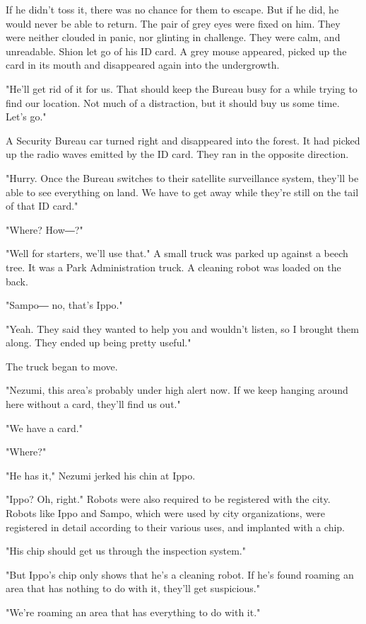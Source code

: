 If he didn't toss it, there was no chance for them to escape. But if he
did, he would never be able to return. The pair of grey eyes were fixed
on him. They were neither clouded in panic, nor glinting in challenge.
They were calm, and unreadable. Shion let go of his ID card. A grey
mouse appeared, picked up the card in its mouth and disappeared again
into the undergrowth.

"He'll get rid of it for us. That should keep the Bureau busy for a
while trying to find our location. Not much of a distraction, but it
should buy us some time. Let's go."

A Security Bureau car turned right and disappeared into the forest. It
had picked up the radio waves emitted by the ID card. They ran in the
opposite direction.

"Hurry. Once the Bureau switches to their satellite surveillance system,
they'll be able to see everything on land. We have to get away while
they're still on the tail of that ID card."

"Where? How―?"

"Well for starters, we'll use that." A small truck was parked up against
a beech tree. It was a Park Administration truck. A cleaning robot was
loaded on the back.

"Sampo― no, that's Ippo."

"Yeah. They said they wanted to help you and wouldn't listen, so I
brought them along. They ended up being pretty useful."

The truck began to move.

"Nezumi, this area's probably under high alert now. If we keep hanging
around here without a card, they'll find us out."

"We have a card."

"Where?"

"He has it," Nezumi jerked his chin at Ippo.

"Ippo? Oh, right." Robots were also required to be registered with the
city. Robots like Ippo and Sampo, which were used by city organizations,
were registered in detail according to their various uses, and implanted
with a chip.

"His chip should get us through the inspection system."

"But Ippo's chip only shows that he's a cleaning robot. If he's found
roaming an area that has nothing to do with it, they'll get suspicious."

"We're roaming an area that has everything to do with it."

